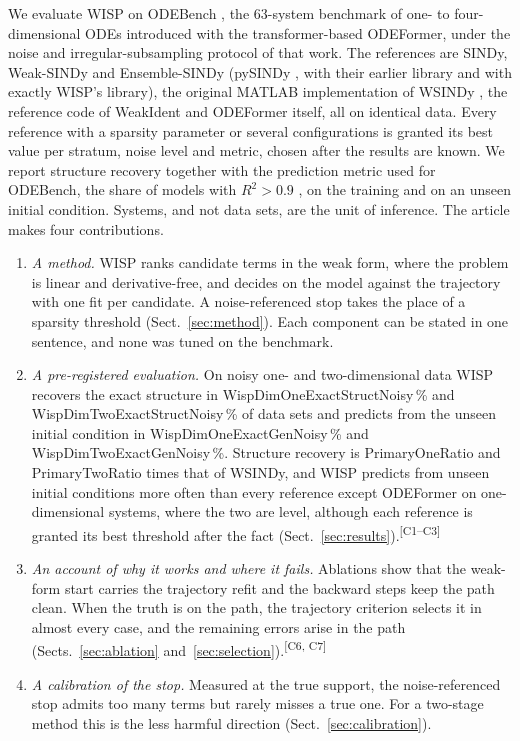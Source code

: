 \documentclass[10pt]{article}
\newcommand{\pv}[1]{\textcolor{prelim}{#1}}
\newcommand{\claimtag}[1]{\textsuperscript{\textcolor{prelim}{\sffamily\tiny[#1]}}}
\newcommand{\pv}[1]{#1}
\newcommand{\claimtag}[1]{}
\newcommand{\m}[1]{\pv{\csname #1\endcsname}}            %
\begin{document}
We evaluate WISP on ODEBench \cite{dascoli2024}, the 63-system benchmark of one- to four-dimensional ODEs introduced
with the transformer-based ODEFormer, under the noise and irregular-subsampling protocol of that work. The references
are SINDy, Weak-SINDy and Ensemble-SINDy (pySINDy \cite{kaptanoglu2022}, with their earlier library and with exactly
WISP's library), the original MATLAB implementation of WSINDy \cite{messenger2021mms}, the reference code of WeakIdent
\cite{tang2023} and ODEFormer \cite{dascoli2024} itself, all on identical data. Every reference with a sparsity
parameter or several configurations is granted its best value per stratum, noise level and metric, chosen after the
results are known. We report structure recovery together with the prediction metric used for ODEBench, the share of
models with $R^2>0.9$ \cite{dascoli2024}, on the training and on an unseen initial condition. Systems, and not data
sets, are the unit of inference. The article makes four contributions.
\begin{enumerate}
\item \emph{A method.} WISP ranks candidate terms in the weak form, where the problem is linear and derivative-free,
and decides on the model against the trajectory with one fit per candidate. A noise-referenced stop takes the place of
a sparsity threshold (Sect.~\ref{sec:method}). Each component can be stated in one sentence, and none was tuned on the
benchmark.
\item \emph{A pre-registered evaluation.} On noisy one- and two-dimensional data WISP recovers the exact structure in
\m{WispDimOneExactStructNoisy}\,\% and \m{WispDimTwoExactStructNoisy}\,\% of data sets and predicts from the unseen
initial condition in \m{WispDimOneExactGenNoisy}\,\% and \m{WispDimTwoExactGenNoisy}\,\%. Structure recovery is
\m{PrimaryOneRatio} and \m{PrimaryTwoRatio} times that of WSINDy, and WISP predicts from unseen initial conditions more
often than every reference except ODEFormer on one-dimensional systems, where the two are level, although each
reference is granted its best threshold after the fact (Sect.~\ref{sec:results}).\claimtag{C1--C3}
\item \emph{An account of why it works and where it fails.} Ablations show that the weak-form start carries the
trajectory refit and the backward steps keep the path clean. When the truth is on the path, the trajectory criterion
selects it in almost every case, and the remaining errors arise in the path (Sects.~\ref{sec:ablation}
and~\ref{sec:selection}).\claimtag{C6, C7}
\item \emph{A calibration of the stop.} Measured at the true support, the noise-referenced stop admits too many terms
but rarely misses a true one. For a two-stage method this is the less harmful direction (Sect.~\ref{sec:calibration}).
\end{enumerate}
\end{document}
